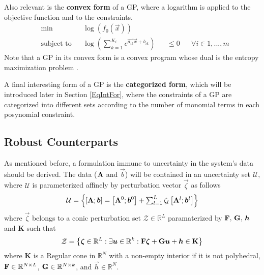 Also relevant is the \textbf{convex form} of a GP, where a logarithm is applied to the objective function and to the constraints.
\begin{equation}
\begin{aligned}
& \min &&\log\left(f_0\left(\vec{x}\right)\right)\\
& \text{subject to} &&\log\left(\textstyle{\sum}_{k=1}^{K_i}e^{\vec{a_{ik}}\vec{x} + b_{ik}}\right) &&\leq 0 &&\forall i \in 1,...,m
\end{aligned}
\label{GP_convex}
\end{equation}
Note that a GP in its convex form is a convex program whose dual is the entropy maximization problem \cite{woodyThesis}.

A final interesting form of a GP is the \textbf{categorized form}, which will be introduced later in Section \ref{EqIntFor}, where the constraints of a GP are categorized into different sets according to the number of monomial terms in each posynomial constraint.
\subsection{Robust Counterparts}
As mentioned before, a formulation immune to uncertainty in the system's data should be derived. The data ($\mathbf{A}$ and $\vec{b}$) will be contained in an uncertainty set $\mathcal{U}$, where $\mathcal{U}$ is parameterized affinely by perturbation vector $\vec{\zeta}$ as follows
\begin{equation}
	\mathcal{U} = \left\{\left[\mat{A};\vec{b}\right] = \left[\mat{A}^0;\vec{b}^0\right] + \textstyle{\sum_{l=1}^{L}\zeta_l\left[\mat{A}^l;\vec{b}^l\right]}\right\}
	\label{Data}
\end{equation}
where $\vec{\zeta}$ belongs to a conic perturbation set $\mathcal{Z} \in \mathbb{R}^L$ paramaterized by $\mathbf{F},\,\mathbf{G},\,\bm{h}$ and $\textbf{K}$ such that
\begin{equation}
\mathcal{Z} = \left\{ \vec{\zeta} \in \mathbb{R}^L: \exists \vec{u} \in \mathbb{R}^k:\mat{F}\vec{\zeta} + \mat{G}\vec{u} + \vec{h} \in \textbf{K} \right\}
\label{perturbation_set}
\end{equation}
where $\mathbf{K}$ is a Regular cone in $\mathbb{R}^N$ with a non-empty interior if it is not polyhedral, $\mathbf{F} \in \mathbb{R}^{N \times L}$, $\mathbf{G} \in \mathbb{R}^{N \times k}$, and $\vec{h} \in \mathbb{R}^{N}$.

